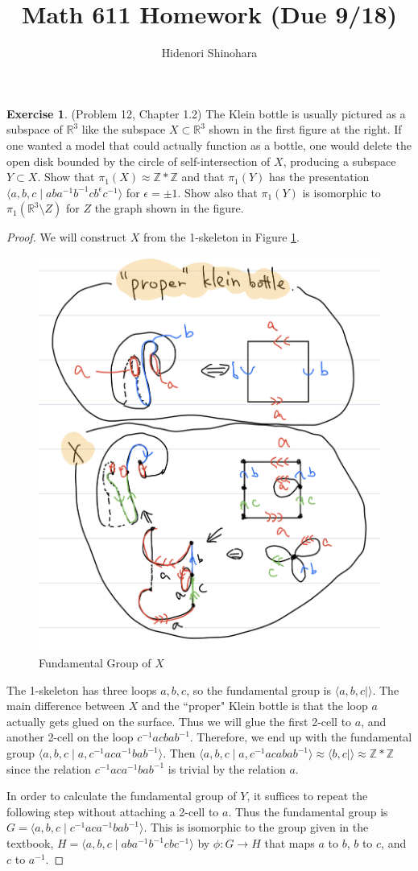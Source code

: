 \documentclass[12pt, psamsfonts]{amsart}
\theoremstyle{definition}
\newtheorem*{exer}{Exercise}
\theoremstyle{remark}
\numberwithin{equation}{section}
\begin{document}
\title{Math 611 Homework (Due 9/18)}
\author{Hidenori Shinohara}
\maketitle


\begin{exer}{(Problem 12, Chapter 1.2)}
  The Klein bottle is usually pictured as a subspace of $\mathbb{R}^3$ like the subspace $X \subset \mathbb{R}^3$ shown in the first figure at the right.
  If one wanted a model that could actually function as a bottle, one would delete the open disk bounded by the circle of self-intersection of $X$, producing a subspace $Y \subset X$.
  Show that $\pi_1(X) \approx \mathbb{Z} * \mathbb{Z}$ and that $\pi_1(Y)$ has the presentation $\langle a, b, c \mid aba^{-1}b^{-1}cb^{\epsilon}c^{-1} \rangle$ for $\epsilon = \pm 1$.
  Show also that $\pi_1(Y)$ is isomorphic to $\pi_1(\mathbb{R}^3 \setminus Z)$ for $Z$ the graph shown in the figure.
\end{exer}

\begin{proof}
  We will construct $X$ from the 1-skeleton in Figure \ref{fig:fund_x_klein}.
  \begin{figure}
    \includegraphics[width=.5\linewidth]{klein_solution_zz.jpeg}
      \caption{Fundamental Group of $X$}
    \label{fig:fund_x_klein}
  \end{figure}
  The 1-skeleton has three loops $a, b, c$, so the fundamental group is $\langle a, b, c \mid \rangle$.
  The main difference between $X$ and the ``proper" Klein bottle is that the loop $a$ actually gets glued on the surface.
  Thus we will glue the first 2-cell to $a$, and another 2-cell on the loop $c^{-1}acbab^{-1}$.
  Therefore, we end up with the fundamental group $\langle a, b, c \mid a, c^{-1}aca^{-1}bab^{-1} \rangle$.
  Then $\langle a, b, c \mid a, c^{-1}acabab^{-1} \rangle \approx \langle b, c \mid \rangle \approx \mathbb{Z} * \mathbb{Z}$ since the relation $c^{-1}aca^{-1}bab^{-1}$ is trivial by the relation $a$.

  In order to calculate the fundamental group of $Y$, it suffices to repeat the following step without attaching a 2-cell to $a$.
  Thus the fundamental group is $G = \langle a, b, c \mid c^{-1}aca^{-1}bab^{-1} \rangle$.
  This is isomorphic to the group given in the textbook, $H = \langle a, b, c \mid aba^{-1}b^{-1}cbc^{-1} \rangle$ by $\phi: G \rightarrow H$ that maps $a$ to $b$, $b$ to $c$, and $c$ to $a^{-1}$.
\end{proof}
\end{document}
